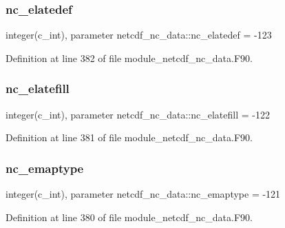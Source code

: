 \subsubsection{\texorpdfstring{nc\+\_\+elatedef}{nc\_elatedef}}
{\footnotesize\ttfamily integer(c\+\_\+int), parameter netcdf\+\_\+nc\+\_\+data\+::nc\+\_\+elatedef = -\/123}



Definition at line 382 of file module\+\_\+netcdf\+\_\+nc\+\_\+data.\+F90.

\mbox{\label{namespacenetcdf__nc__data_a35546e0bc279190e09ff3c7fd38ba0e0}} 
\subsubsection{\texorpdfstring{nc\+\_\+elatefill}{nc\_elatefill}}
{\footnotesize\ttfamily integer(c\+\_\+int), parameter netcdf\+\_\+nc\+\_\+data\+::nc\+\_\+elatefill = -\/122}



Definition at line 381 of file module\+\_\+netcdf\+\_\+nc\+\_\+data.\+F90.

\mbox{\label{namespacenetcdf__nc__data_ae126761580f911f20a8576a543ed1745}} 
\subsubsection{\texorpdfstring{nc\+\_\+emaptype}{nc\_emaptype}}
{\footnotesize\ttfamily integer(c\+\_\+int), parameter netcdf\+\_\+nc\+\_\+data\+::nc\+\_\+emaptype = -\/121}



Definition at line 380 of file module\+\_\+netcdf\+\_\+nc\+\_\+data.\+F90.

\mbox{\label{namespacenetcdf__nc__data_aa455239c6123d7b9db4fd6e67da4d46e}} 
